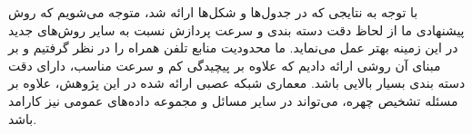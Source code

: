 \noindent
با توجه به نتایجی که در جدول‌ها و شکل‌ها ارائه شد، متوجه می‌شویم که روش پیشنهادی ما از لحاظ دقت دسته بندی و سرعت پردازش نسبت به سایر روش‌های جدید در این زمینه بهتر عمل می‌نماید. ما محدودیت منابع تلفن همراه را در نظر گرفتیم و بر مبنای آن روشی ارائه دادیم که علاوه بر پیچیدگی کم و سرعت مناسب، دارای دقت دسته بندی بسیار بالایی باشد. معماری شبکه عصبی ارائه شده در این پژوهش، علاوه بر مسئله تشخیص چهره، می‌تواند در سایر مسائل و مجموعه داده‌های عمومی نیز کارامد باشد.
